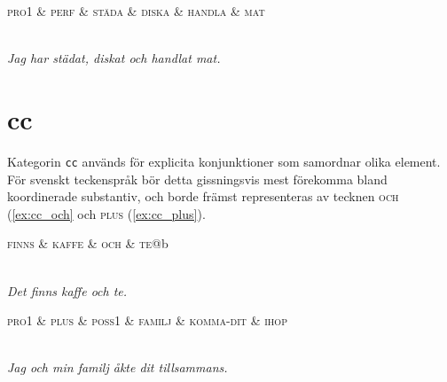 \documentclass[11pt,a4paper]{article}
\begin{document}
\begin{example}
\label{ex:conj_verb}
\begin{dependency}[theme = simple]
   \begin{deptext}[column sep=1em]
      \textsc{pro1} \& \textsc{perf} \& \textsc{städa} \& \textsc{diska} \& \textsc{handla} \& \textsc{mat} \\
   \end{deptext}
\end{dependency}
\\
\textit{Jag har städat, diskat och handlat mat.}
\end{example}

\section{cc}
\label{sec:cc}
Kategorin \texttt{cc} används för explicita konjunktioner som samordnar olika element. För svenskt teckenspråk bör detta gissningsvis mest förekomma bland koordinerade substantiv, och borde främst representeras av tecknen \textsc{och} (\ref{ex:cc_och} och \textsc{plus} (\ref{ex:cc_plus}).

\begin{example}
\label{ex:cc_och}
\begin{dependency}[theme = simple]
   \begin{deptext}[column sep=1em]
      \textsc{finns} \& \textsc{kaffe} \& \textsc{och} \& \textsc{te}@b \\
   \end{deptext}
\end{dependency}
\\
\textit{Det finns kaffe och te.}
\end{example}

\begin{example}
\label{ex:cc_plus}
\begin{dependency}[theme = simple]
   \begin{deptext}[column sep=1em]
      \textsc{pro1} \& \textsc{plus} \& \textsc{poss1} \& \textsc{familj} \& \textsc{komma-dit} \& \textsc{ihop} \\
   \end{deptext}
\end{dependency}
\\
\textit{Jag och min familj åkte dit tillsammans.}
\end{example}
\end{document}
